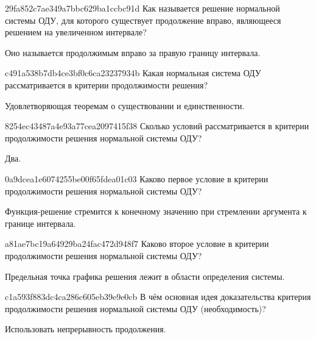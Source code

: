 \begin{note}{29fa852c7ae349a7bbc629ba1ccbc91d}
    Как называется решение нормальной системы ОДУ, для которого существует продолжение вправо, являющееся решением на увеличенном интервале?

    \begin{cloze}{1}
        Оно называется продолжимым вправо за правую границу интервала.
    \end{cloze}
\end{note}

\begin{note}{c491a538b7db4ce3bf0c6ca23237934b}
    Какая нормальная система ОДУ рассматривается в критерии продолжимости решения?

    \begin{cloze}{1}
        Удовлетворяющая теоремам о существовании и единственности.
    \end{cloze}
\end{note}

\begin{note}{8254ec43487a4e93a77cea2097415f38}
    Сколько условий рассматривается в критерии продолжимости решения нормальной системы ОДУ?

    \begin{cloze}{1}
        Два.
    \end{cloze}
\end{note}

\begin{note}{0a9dcea1e6074255be00f65fdea01c03}
    Каково первое условие в критерии продолжимости решения нормальной системы ОДУ?

    \begin{cloze}{1}
        Функция-решение стремится к конечному значению при стремлении аргумента к границе интервала.
    \end{cloze}
\end{note}

\begin{note}{a81ae7bc19a64929ba24fac472d948f7}
    Каково второе условие в критерии продолжимости решения нормальной системы ОДУ?

    \begin{cloze}{1}
        Предельная точка графика решения лежит в области определения системы.
    \end{cloze}
\end{note}

\begin{note}{c1a593f883dc4ca286c605eb39e9e0cb}
    В чём основная идея доказательства критерия продолжимости решения нормальной системы ОДУ (необходимость)?

    \begin{cloze}{1}
        Использовать непрерывность продолжения.
    \end{cloze}
\end{note}

